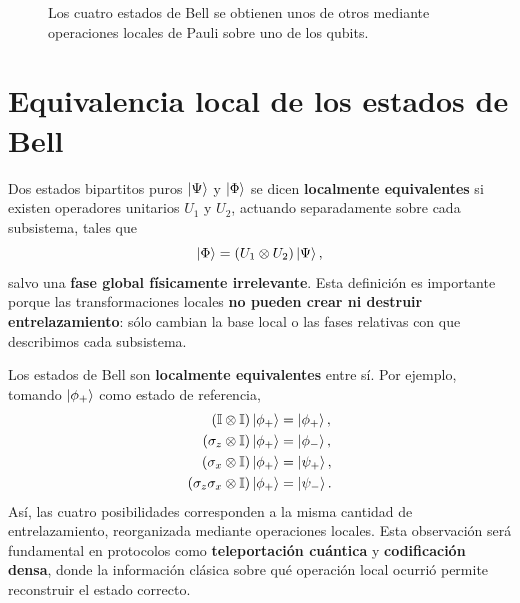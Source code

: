 \documentclass[../main.tex]{subfiles}
\begin{document}
\begin{figure}[htbp]
    \centering
    \caption{Los cuatro estados de Bell se obtienen unos de otros mediante operaciones locales de Pauli sobre uno de los qubits.}
    \label{fig:orbita-local-bell}
\end{figure}

\section{Equivalencia local de los estados de Bell}

Dos estados bipartitos puros $\ket{\Psi}$ y $\ket{\Phi}$ se dicen \textbf{localmente equivalentes} si existen operadores unitarios $U_1$ y $U_2$, actuando separadamente sobre cada subsistema, tales que
\begin{equation*}
    \ket{\Phi}=\left(U_1\otimes U_2\right)\ket{\Psi},
\end{equation*}
salvo una \textbf{fase global físicamente irrelevante}. Esta definición es importante porque las transformaciones locales \textbf{no pueden crear ni destruir entrelazamiento}: sólo cambian la base local o las fases relativas con que describimos cada subsistema.

Los estados de Bell son \textbf{localmente equivalentes} entre sí. Por ejemplo, tomando $\ket{\phi_+}$ como estado de referencia,
\begin{align*}
    \left(\mathbb{I}\otimes\mathbb{I}\right)\ket{\phi_+}&=\ket{\phi_+},\\
    \left(\sigma_z\otimes\mathbb{I}\right)\ket{\phi_+}&=\ket{\phi_-},\\
    \left(\sigma_x\otimes\mathbb{I}\right)\ket{\phi_+}&=\ket{\psi_+},\\
    \left(\sigma_z\sigma_x\otimes\mathbb{I}\right)\ket{\phi_+}&=\ket{\psi_-}.
\end{align*}
Así, las cuatro posibilidades corresponden a la misma cantidad de entrelazamiento, reorganizada mediante operaciones locales. Esta observación será fundamental en protocolos como \textbf{teleportación cuántica} y \textbf{codificación densa}, donde la información clásica sobre qué operación local ocurrió permite reconstruir el estado correcto.


\end{document}
